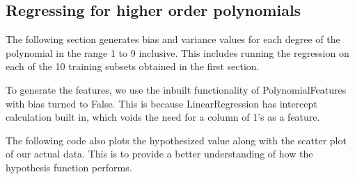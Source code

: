 \documentclass[11pt]{article}
\begin{document}
    \subsection{Regressing for higher order
polynomials}\label{regressing-for-higher-order-polynomials}

The following section generates bias and variance values for each degree
of the polynomial in the range 1 to 9 inclusive. This includes running
the regression on each of the 10 training subsets obtained in the first
section.

To generate the features, we use the inbuilt functionality of
PolynomialFeatures with bias turned to False. This is because
LinearRegression has intercept calculation built in, which voids the
need for a column of 1's as a feature.

The following code also plots the hypothesized value along with the
scatter plot of our actual data. This is to provide a better
understanding of how the hypothesis function performs.
\end{document}
